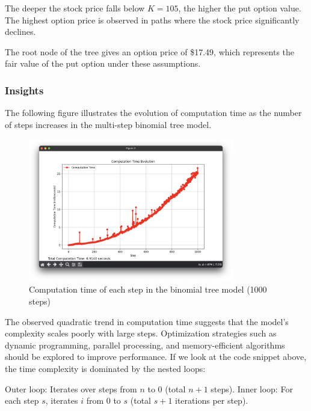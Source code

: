 \documentclass{article}
\begin{document}
    \medskip

    The deeper the stock price falls below \( K = 105 \), the higher the put option value. The highest option price is observed in paths where the stock price significantly declines.

    The root node of the tree gives an option price of \$17.49, which represents the fair value of the put option under these assumptions.

    \subsubsection{Insights}


    The following figure illustrates the evolution of computation time as the number of steps increases in the multi-step binomial tree model.

    \begin{figure}[h]
        \centering
        \includegraphics[width=0.8\textwidth]{ComputationTime_BinTree_v1}
        \caption{Computation time of each step in the binomial tree model (1000 steps)}
        \label{fig:computation_time_bintree_v1}
    \end{figure}

    The observed quadratic trend in computation time suggests that the model’s complexity scales poorly with large steps. Optimization strategies such as dynamic programming, parallel processing, and memory-efficient algorithms should be explored to improve performance.
    If we look at the code snippet above, the time complexity is dominated by the nested loops:

    \bigbreak

    Outer loop: Iterates over steps from \( n \) to \( 0 \) (total \( n + 1 \) steps).
    Inner loop: For each step \( s \), iterates \( i \) from \( 0 \) to \( s \) (total \( s + 1 \) iterations per step).
\end{document}
